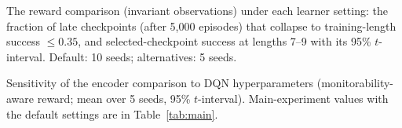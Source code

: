 \begin{table}[t]
\centering
\small
\setlength{\tabcolsep}{3pt}
\caption{The reward comparison (invariant observations) under each learner setting: the fraction of late checkpoints (after 5{,}000 episodes) that collapse to training-length success $\le 0.35$, and selected-checkpoint success at lengths 7--9 with its 95\% $t$-interval. Default: 10 seeds; alternatives: 5 seeds.}
\label{tab:sensitivity_rewards}
\resizebox{\linewidth}{!}{}
\end{table}

\begin{table}[t]
\centering
\small
\setlength{\tabcolsep}{3pt}
\caption{Sensitivity of the encoder comparison to DQN hyperparameters (monitorability-aware reward; mean over 5 seeds, 95\% $t$-interval). Main-experiment values with the default settings are in Table~\ref{tab:main}.}
\label{tab:sensitivity}
\resizebox{\linewidth}{!}{}
\end{table}
